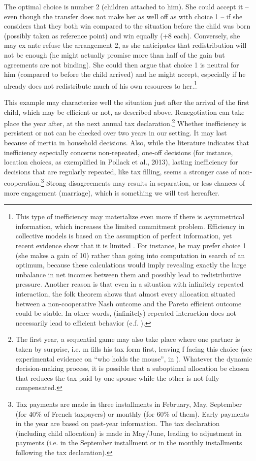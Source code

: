 The optimal choice is number 2 (children attached to him). She could accept it – even though the transfer does not make her as well off as with choice 1 – if she considers that they both win compared to the situation before the child was born (possibly taken as reference point) and win equally (+8 each). Conversely, she may ex ante refuse the arrangement 2, as she anticipates that redistribution will not be enough (he might actually promise more than half of the gain but agreements are not binding). She could then argue that choice 1 is neutral for him (compared to before the child arrived) and he might accept, especially if he already does not redistribute much of his own resources to her.\footnote{
    This type of inefficiency may materialize even more if there is asymmetrical information, which increases the limited commitment problem. Efficiency in collective models is based on the assumption of perfect information, yet recent evidence show that it is limited \citep{baland2017intra}. For instance, he may prefer choice 1 (she makes a gain of 10) rather than going into computation in search of an optimum, because these calculations would imply revealing exactly the large unbalance in net incomes between them and possibly lead to redistributive pressure. Another reason is that even in a situation with infinitely repeated interaction, the folk theorem shows that almost every allocation situated between a non-cooperative Nash outcome and the Pareto efficient outcome could be stable.  In other words, (infinitely) repeated interaction does not necessarily lead to efficient behavior (c.f. \citet{baland2017intra}).}

This example may characterize well the situation just after the arrival of the first child, which may be efficient or not, as described above. Renegotiation can take place the year after, at the next annual tax declaration.\footnote{
    The first year, a sequential game may also take place where one partner is taken by surprise, i.e. m fills his tax form first, leaving f facing this choice (see experimental evidence on “who holds the mouse”, in \citet{de2011individual}). Whatever the dynamic decision-making process, it is possible that a suboptimal allocation be chosen that reduces the tax paid by one spouse while the other is not fully compensated.}
Whether inefficiency is persistent or not can be checked over two years in our setting. It may last because of inertia in household decisions. Also, while the literature indicates that inefficiency especially concerns non-repeated, one-off decisions (for instance, location choices, as exemplified in Pollack et al., 2013), %
lasting inefficiency for decisions that are regularly repeated, like tax filling, seems a stronger case of non-cooperation.\footnote{
    Tax payments are made in three installments in February, May, September (for 40\% of French taxpayers) or monthly (for 60\% of them). Early payments in the year are based on past-year information. The tax declaration (including child allocation) is made in May/June, leading to adjustment in payments (i.e. in the September installment or in the monthly installments following the tax declaration).}
Strong disagreements may results in separation, or less chances of more engagement (marriage), which is something we will test hereafter.


